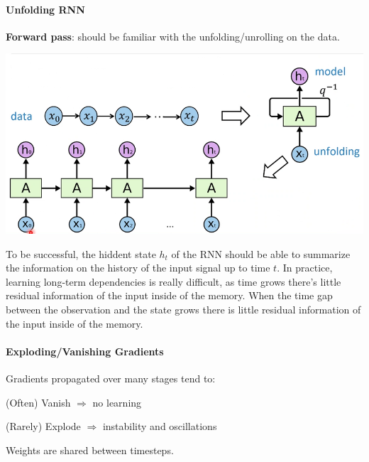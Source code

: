 \documentclass[10pt]{report}
\begin{document}
\paragraph{Unfolding RNN} \textbf{Forward pass}: should be familiar with the unfolding/unrolling on the data.\begin{center}
	\includegraphics[scale=0.5]{92.png}
\end{center}
To be successful, the hiddent state $h_t$ of the RNN should be able to summarize the information on the history of the input signal up to time $t$. In practice, learning long-term dependencies is really difficult, as time grows there's little residual information of the input inside of the memory. When the time gap between the observation and the state grows
there is little residual information of the input inside of the memory.
\paragraph{Exploding/Vanishing Gradients} Gradients propagated over many stages tend to:
\begin{list}{}{}
	\item (Often) Vanish $\Rightarrow$ no learning
	\item (Rarely) Explode $\Rightarrow$ instability and oscillations
\end{list}
Weights are shared between timesteps.
\pagebreak
\end{document}
